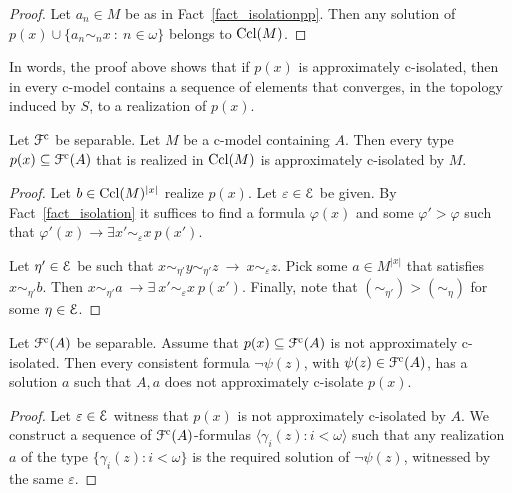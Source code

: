\documentclass{amsproc}
\begin{document}
{\begin{proof}
  Let $a_n\in M$ be as in Fact~\ref{fact_isolationpp}.
  Then any solution of $p(x)\cup\big\{a_n\sim_nx\ :\ n\in\omega\big\}$ belongs to ${\rm Ccl}(M)$.
\end{proof}

In words, the proof above shows that if $p(x)$ is approximately c-isolated, then in every c-model contains a sequence of elements that converges, in the topology induced by $S$, to a realization of $p(x)$.

\begin{fact}\label{fact_wcisolatio_realization}
  Let ${\EuScript F}^{\rm c}$ be separable.
  Let $M$ be a c-model containing $A$.
  Then every type $p(x)\subseteq{\EuScript F}^{\rm c}(A)$ that is realized in ${\rm Ccl}(M)$ is approximately c-isolated by $M$.
\end{fact}

\begin{proof}
  Let $b\in{\rm Ccl}(M)^{|x|}$ realize $p(x)$.
  Let $\varepsilon\in{\EuScript E}$ be given.
  By Fact~\ref{fact_isolation} it suffices to find a formula $\varphi(x)$ and some $\varphi'>\varphi$ such that $\varphi'(x)\rightarrow\exists x'\sim_\varepsilon x\ p(x')$.

  Let $\eta'\in{\EuScript E}$ be such that $x\sim_{\eta'} y\sim_{\eta'} z\ \rightarrow\ x\sim_\varepsilon z$.
  Pick some $a\in M^{|x|}$ that satisfies $x\sim_{\eta'} b$.
  Then $x\sim_{\eta'}a\ \rightarrow\exists\ x'\sim_\varepsilon x\ p(x')$.
  Finally, note that $(\sim_{\eta'})>(\sim_\eta)$ for some $\eta\in{\EuScript E}$.
\end{proof}

\begin{lemma}\label{lem_kuratowskiUlam_cont}
  Let ${\EuScript F}^{\rm c}(A)$ be separable.
  Assume that $p(x)\subseteq{\EuScript F}^{\rm c}(A)$ is not approximately c-isolated.
  Then every consistent formula $\neg\psi(z)$, with $\psi(z)\in{\EuScript F}^{\rm c}(A)$, has a solution $a$ such that $A,a$ does not approximately c-isolate $p(x)$.
\end{lemma}

\begin{proof}
  Let $\varepsilon\in{\EuScript E}$ witness that $p(x)$ is not approximately c-isolated by $A$. 
  We construct a sequence of ${\EuScript F}^{\rm c}(A)$-formulas $\langle\gamma_i(z):i<\omega\rangle$ such that any realization $a$ of the type $\big\{\gamma_i(z):i<\omega\big\}$ is the required solution of $\neg\psi(z)$, witnessed by the same $\varepsilon$.
  

\end{proof}}
\end{document}
